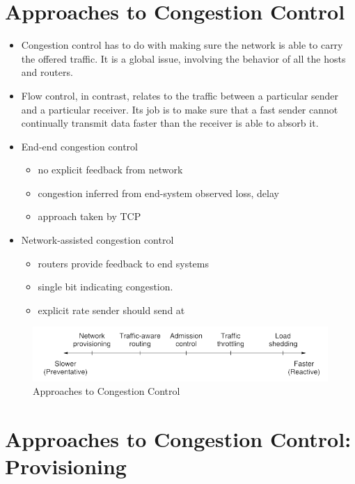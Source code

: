 \documentclass[twoside]{article}
\begin{document}
\section*{Approaches to Congestion Control}
\begin{itemize}
    \item Congestion control has to do with making sure the network is able to
carry the offered traffic. It is a global issue, involving the behavior of all
the hosts and routers.
    \item Flow control, in contrast, relates to the traffic between a particular sender and a particular receiver. Its job is to make sure that a fast sender cannot continually transmit data faster than the receiver is able to absorb it.
    \item End-end congestion control
    \begin{itemize}
        \item no explicit feedback from network
        \item congestion inferred from end-system observed loss, delay
        \item approach taken by TCP
    \end{itemize}
    \item Network-assisted congestion control
    \begin{itemize}
        \item routers provide feedback to end systems
        \item single bit indicating congestion.
        \item explicit rate sender should send at
    \end{itemize}
\end{itemize}
\begin{figure}
    \centering
    \includegraphics[width=\textwidth]{images/atcc.png}
    \caption{Approaches to Congestion Control}
\end{figure}
\newline \section*{Approaches to Congestion Control: Provisioning}
\end{document}
